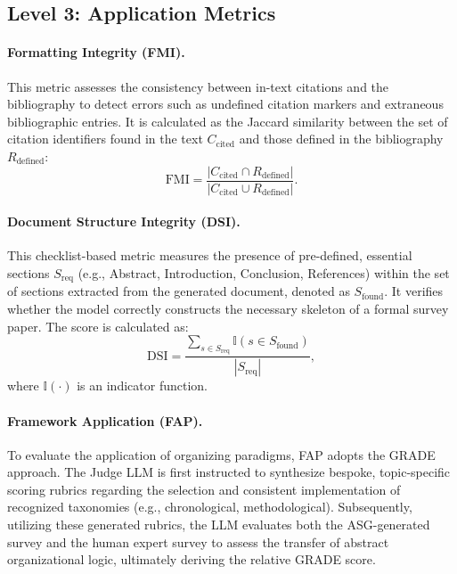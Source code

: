 \documentclass[11pt]{article}
\begin{document}
\subsection{Level 3: Application Metrics}
\paragraph{Formatting Integrity (FMI).} 
    This metric assesses the consistency between in-text citations and the bibliography to detect errors such as undefined citation markers and extraneous bibliographic entries. It is calculated as the Jaccard similarity between the set of citation identifiers found in the text \(C_{\text{cited}}\) and those defined in the bibliography \(R_{\text{defined}}\):
    {
    \setlength{\abovedisplayskip}{6pt}%
    \setlength{\belowdisplayskip}{6pt}%
    \begin{equation}
    \text{FMI} = \frac{|C_{\text{cited}} \cap R_{\text{defined}}|}{|C_{\text{cited}} \cup R_{\text{defined}}|}.
    \end{equation}
    }

\paragraph{Document Structure Integrity (DSI).} This checklist-based metric measures the presence of pre-defined, essential sections $S_{\text{req}}$ (e.g., Abstract, Introduction, Conclusion, References) within the set of sections extracted from the generated document, denoted as $S_{\text{found}}$. It verifies whether the model correctly constructs the necessary skeleton of a formal survey paper. The score is calculated as:
    {
    \setlength{\abovedisplayskip}{6pt}%
    \setlength{\belowdisplayskip}{6pt}%
    \begin{equation}
        \text{DSI} = \frac{\sum_{s \in S_{\text{req}}} \mathbb{I}(s \in S_{\text{found}})}{|S_{\text{req}}|},
    \end{equation}
    }
    where \(\mathbb{I}(\cdot)\) is an indicator function.


\paragraph{Framework Application (FAP).}
To evaluate the application of organizing paradigms, FAP adopts the GRADE approach. The Judge LLM is first instructed to synthesize bespoke, topic-specific scoring rubrics regarding the selection and consistent implementation of recognized taxonomies (e.g., chronological, methodological). Subsequently, utilizing these generated rubrics, the LLM evaluates both the ASG-generated survey and the human expert survey to assess the transfer of abstract organizational logic, ultimately deriving the relative GRADE score.
\end{document}

